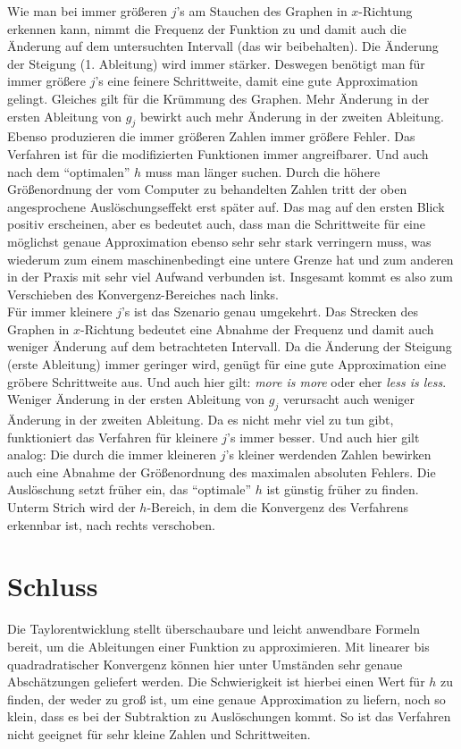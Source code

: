 \documentclass{scrartcl}
\begin{document}
Wie man bei immer größeren $j$'s am Stauchen des Graphen in $x$-Richtung erkennen kann, nimmt die Frequenz der Funktion zu und damit auch die Änderung auf dem untersuchten Intervall (das wir beibehalten). Die Änderung der Steigung (1. Ableitung) wird immer stärker. Deswegen benötigt man für immer größere $j$'s eine feinere Schrittweite, damit eine gute Approximation gelingt. Gleiches gilt für die Krümmung des Graphen. Mehr Änderung in der ersten Ableitung von $g_j$ bewirkt auch mehr Änderung in der zweiten Ableitung. Ebenso produzieren die immer größeren Zahlen immer größere Fehler. Das Verfahren ist für die modifizierten Funktionen immer angreifbarer. Und auch nach dem "`optimalen"' $h$ muss man länger suchen. Durch die höhere Größenordnung der vom Computer zu behandelten Zahlen tritt der oben angesprochene Auslöschungseffekt erst später auf. Das mag auf den ersten Blick positiv erscheinen, aber es bedeutet auch, dass man die Schrittweite für eine möglichst genaue Approximation ebenso sehr sehr stark verringern muss, was wiederum zum einem maschinenbedingt eine untere Grenze hat und zum anderen in der Praxis mit sehr viel Aufwand verbunden ist. Insgesamt kommt es also zum Verschieben des Konvergenz-Bereiches nach links. \\
Für immer kleinere $j$'s ist das Szenario genau umgekehrt. Das Strecken des Graphen in $x$-Richtung bedeutet eine Abnahme der Frequenz und damit auch weniger Änderung auf dem betrachteten Intervall. Da die Änderung der Steigung (erste Ableitung) immer geringer wird, genügt für eine gute Approximation eine gröbere Schrittweite aus. Und auch hier gilt: \textit{more is more} oder eher \textit{less is less}. Weniger Änderung in der ersten Ableitung von $g_j$ verursacht auch weniger Änderung in der zweiten Ableitung. Da es nicht mehr viel zu tun gibt, funktioniert das Verfahren für kleinere $j$'s immer besser. Und auch hier gilt analog: Die durch die immer kleineren $j$'s kleiner werdenden Zahlen bewirken auch eine Abnahme der Größenordnung des maximalen absoluten Fehlers. Die Auslöschung setzt früher ein, das "`optimale"' $h$ ist günstig früher zu finden. Unterm Strich wird der $h$-Bereich, in dem die Konvergenz des Verfahrens erkennbar ist, nach rechts verschoben. \\

\pagebreak \section{Schluss}
\label{sec:schluss}
Die Taylorentwicklung stellt überschaubare und leicht anwendbare Formeln bereit, um die Ableitungen einer Funktion zu approximieren.
Mit linearer bis quadradratischer Konvergenz können hier unter Umständen sehr genaue Abschätzungen geliefert werden.
Die Schwierigkeit ist hierbei einen Wert für $h$ zu finden, der weder zu groß ist, um eine genaue Approximation zu liefern, noch so klein, dass es bei der Subtraktion zu Auslöschungen kommt.
So ist das Verfahren nicht geeignet für sehr kleine Zahlen und Schrittweiten.\\
\end{document}
